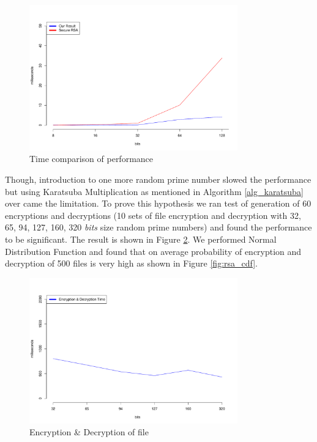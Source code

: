 \documentclass[12pt,journal,compsoc]{IEEEtran}
\begin{document}
\begin{figure}[ht!]
\centering
\includegraphics[width=90mm]{images/rsaVSjava.pdf}
\caption{Time comparison of performance}
\label{fig:rsaVSjava}
\end{figure}

Though, introduction to one more random prime number slowed the performance but using Karatsuba Multiplication as mentioned in Algorithm \ref{alg_karatsuba} over came the limitation. To prove this hypothesis we ran test of generation of 60 encryptions and decryptions (10 sets of file encryption and decryption with 32, 65, 94, 127, 160, 320 \emph{bits} size random prime numbers) and found the performance to be significant. The result is shown in Figure \ref{fig:rsa_time}. We performed Normal Distribution Function and found that on average probability of encryption and decryption of 500 files is very high as shown in Figure \ref{fig:rsa_cdf}.

\begin{figure}[ht!]
\centering
\includegraphics[width=90mm]{images/encryptionTime.pdf}
\caption{Encryption \& Decryption of file}
\label{fig:rsa_time}
\end{figure}
\end{document}
